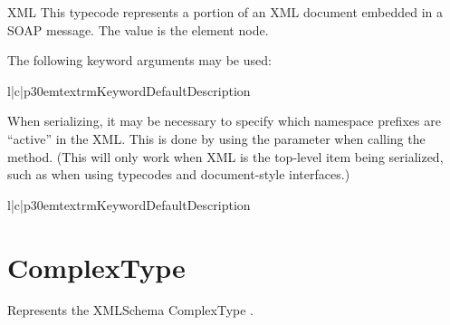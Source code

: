 \begin{classdesc}{XML}{}
This typecode represents a portion of an XML document embedded in a SOAP
message.
The value is the element node.

The following keyword arguments may be used:

\begin{tableiii}{l|c|p{30em}}{textrm}{Keyword}{Default}{Description}
\end{tableiii}
\end{classdesc}

When serializing, it may be necessary to specify which namespace prefixes
are ``active'' in the XML.
This is done by using the  parameter when
calling the  method.
(This will only work when XML is the top-level item being serialized,
such as when using typecodes and document-style interfaces.)

\begin{tableiii}{l|c|p{30em}}{textrm}{Keyword}{Default}{Description}
\end{tableiii}

\section{ComplexType}

Represents the XMLSchema ComplexType .

